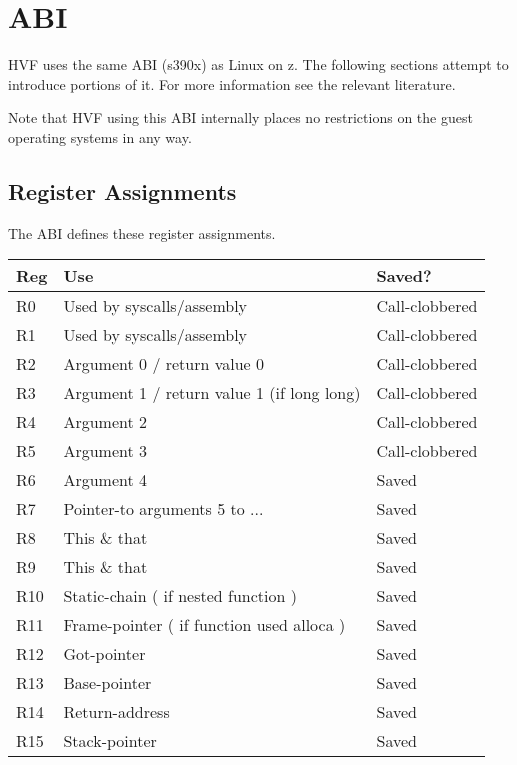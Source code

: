 \chapter{ABI}
\label{chap:abi}
HVF uses the same ABI (s390x) as Linux on z.  The following sections attempt
to introduce portions of it.  For more information see the relevant
literature.

Note that HVF using this ABI internally places no restrictions on the guest
operating systems in any way.

\section{Register Assignments}
The ABI defines these register assignments.

\begin{center}
\begin{tabular}{|l|l|l|}
\hline
Reg   &   Use                                        &Saved? \\
\hline\hline
R0    &   Used by syscalls/assembly                  &Call-clobbered \\
R1    &   Used by syscalls/assembly                  &Call-clobbered \\
R2    &   Argument 0 / return value 0                &Call-clobbered \\
R3    &   Argument 1 / return value 1 (if long long) &Call-clobbered \\
R4    &   Argument 2                                 &Call-clobbered \\
R5    &   Argument 3                                 &Call-clobbered \\
R6    &   Argument 4                                 &Saved \\
R7    &   Pointer-to arguments 5 to ...              &Saved \\
R8    &   This \& that                               &Saved \\
R9    &   This \& that                               &Saved \\
R10   &   Static-chain ( if nested function )        &Saved \\
R11   &   Frame-pointer ( if function used alloca )  &Saved \\
R12   &   Got-pointer                                &Saved \\
R13   &   Base-pointer                               &Saved \\
R14   &   Return-address                             &Saved \\
R15   &   Stack-pointer                              &Saved \\
\hline
\end{tabular}
\end{center}

